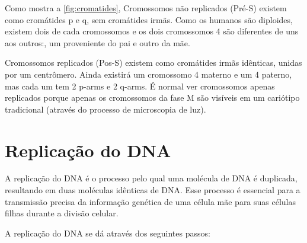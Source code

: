 \documentclass[11pt,a4paper]{article}
\begin{document}
  
    	Como mostra a \ref{fig:cromatides}, Cromossomos não replicados (Pré-S) existem como cromátides p e q, sem cromátides irmãs. Como os humanos são diploides, existem dois de cada cromossomos e os dois cromossomos 4 são diferentes de uns aos outros:, um proveniente do pai e outro da mãe. 

    	Cromossomos replicados (Pos-S) existem como cromátides irmãs idênticas, unidas por um centrômero. Ainda existirá um cromossomo 4 materno e um 4 paterno, mas cada um tem 2 p-arms e 2 q-arms. É normal ver cromossomos apenas replicados porque apenas os cromossomos da fase M são visíveis em um cariótipo tradicional (através do processo de microscopia de luz).

	\section{Replicação do DNA}

	A replicação do DNA é o processo pelo qual uma molécula de DNA é duplicada, resultando em duas moléculas idênticas de DNA. Esse processo é essencial para a transmissão precisa da informação genética de uma célula mãe para suas células filhas durante a divisão celular.

	A replicação do DNA se dá através dos seguintes passos:
\end{document}
